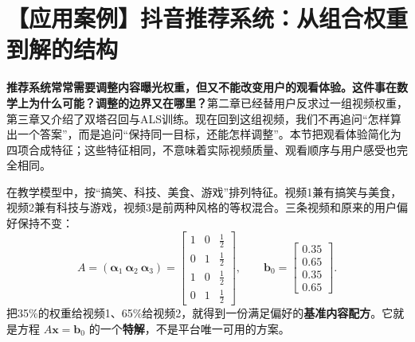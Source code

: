\documentclass[a4paper,12pt,twoside,openany,fontset=none]{ctexbook}
\numberwithin{equation}{chapter}
\begin{document}
\section{【应用案例】抖音推荐系统：从组合权重到解的结构}
\label{sec:five-recommendation-structure}
\begingroup
{}
\newcommand{\FiveRecFigure}[4]{%
 \begingroup\edef\FiveRecSavedFigure{\arabic{figure}}%
 \renewcommand{\thefigure}{\thechapter.10#1}%
 \renewcommand{\theHfigure}{\thechapter.recommendation.#1}%
 \begin{figure}[htbp]\centering
 #4\par\caption{#2}\label{#3}
 \end{figure}%
 \setcounter{figure}{\FiveRecSavedFigure}\endgroup}

\textbf{推荐系统常常需要调整内容曝光权重，但又不能改变用户的观看体验。这件事在数学上为什么可能？调整的边界又在哪里？}第二章已经替用户反求过一组视频权重，第三章又介绍了双塔召回与ALS训练。现在回到这组视频，我们不再追问“怎样算出一个答案”，而是追问“保持同一目标，还能怎样调整”。本节把观看体验简化为四项合成特征；这些特征相同，不意味着实际视频质量、观看顺序与用户感受也完全相同。

在教学模型中，按“搞笑、科技、美食、游戏”排列特征。视频1兼有搞笑与美食，视频2兼有科技与游戏，视频3是前两种风格的等权混合。三条视频和原来的用户偏好保持不变：
\begin{equation}
 A=(\boldsymbol\alpha_1\ \boldsymbol\alpha_2\ \boldsymbol\alpha_3)
 =\begin{bmatrix}1&0&\tfrac12\\0&1&\tfrac12\\1&0&\tfrac12\\0&1&\tfrac12\end{bmatrix},
 \qquad\boldsymbol b_0=\begin{bmatrix}0.35\\0.65\\0.35\\0.65\end{bmatrix}.
 \label{eq:five-rec-library}
\end{equation}
把35\%的权重给视频1、65\%给视频2，就得到一份满足偏好的\textbf{基准内容配方}。它就是方程 $A\boldsymbol x=\boldsymbol b_0$ 的一个\textbf{特解}，不是平台唯一可用的方案。
\end{document}
